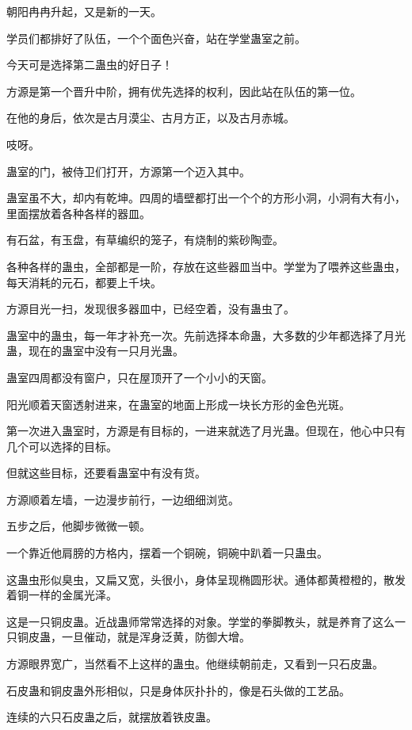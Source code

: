 
\begin{this_body}

朝阳冉冉升起，又是新的一天。

学员们都排好了队伍，一个个面色兴奋，站在学堂蛊室之前。

今天可是选择第二蛊虫的好日子！

方源是第一个晋升中阶，拥有优先选择的权利，因此站在队伍的第一位。

在他的身后，依次是古月漠尘、古月方正，以及古月赤城。

吱呀。

蛊室的门，被侍卫们打开，方源第一个迈入其中。

蛊室虽不大，却内有乾坤。四周的墙壁都打出一个个的方形小洞，小洞有大有小，里面摆放着各种各样的器皿。

有石盆，有玉盘，有草编织的笼子，有烧制的紫砂陶壶。

各种各样的蛊虫，全部都是一阶，存放在这些器皿当中。学堂为了喂养这些蛊虫，每天消耗的元石，都要上千块。

方源目光一扫，发现很多器皿中，已经空着，没有蛊虫了。

蛊室中的蛊虫，每一年才补充一次。先前选择本命蛊，大多数的少年都选择了月光蛊，现在的蛊室中没有一只月光蛊。

蛊室四周都没有窗户，只在屋顶开了一个小小的天窗。

阳光顺着天窗透射进来，在蛊室的地面上形成一块长方形的金色光斑。

第一次进入蛊室时，方源是有目标的，一进来就选了月光蛊。但现在，他心中只有几个可以选择的目标。

但就这些目标，还要看蛊室中有没有货。

方源顺着左墙，一边漫步前行，一边细细浏览。

五步之后，他脚步微微一顿。

一个靠近他肩膀的方格内，摆着一个铜碗，铜碗中趴着一只蛊虫。

这蛊虫形似臭虫，又扁又宽，头很小，身体呈现椭圆形状。通体都黄橙橙的，散发着铜一样的金属光泽。

这是一只铜皮蛊。近战蛊师常常选择的对象。学堂的拳脚教头，就是养育了这么一只铜皮蛊，一旦催动，就是浑身泛黄，防御大增。

方源眼界宽广，当然看不上这样的蛊虫。他继续朝前走，又看到一只石皮蛊。

石皮蛊和铜皮蛊外形相似，只是身体灰扑扑的，像是石头做的工艺品。

连续的六只石皮蛊之后，就摆放着铁皮蛊。


\end{this_body}

